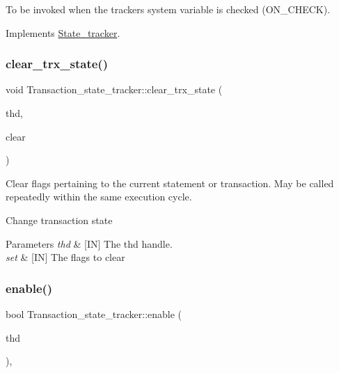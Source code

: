 To be invoked when the tracker\textquotesingle{}s system variable is checked (O\+N\+\_\+\+C\+H\+E\+CK). 

Implements \mbox{\hyperlink{classState__tracker_a50923266a6300e657b70dc4f0125782c}{State\+\_\+tracker}}.

\mbox{\label{classTransaction__state__tracker_aa8a01939d3da4f3e87e5b833f79b635f}} 
\subsubsection{\texorpdfstring{clear\+\_\+trx\+\_\+state()}{clear\_trx\_state()}}
{\footnotesize\ttfamily void Transaction\+\_\+state\+\_\+tracker\+::clear\+\_\+trx\+\_\+state (\begin{DoxyParamCaption}\item[{T\+HD $\ast$}]{thd,  }\item[{uint}]{clear }\end{DoxyParamCaption})}



Clear flags pertaining to the current statement or transaction. May be called repeatedly within the same execution cycle. 

Change transaction state


\begin{DoxyParams}{Parameters}
{\em thd} & \mbox{[}IN\mbox{]} The thd handle. \\
\hline
{\em set} & \mbox{[}IN\mbox{]} The flags to clear \\
\hline
\end{DoxyParams}
\mbox{\label{classTransaction__state__tracker_a1027295403af650734a45d8281cc5d1c}} 
\subsubsection{\texorpdfstring{enable()}{enable()}}
{\footnotesize\ttfamily bool Transaction\+\_\+state\+\_\+tracker\+::enable (\begin{DoxyParamCaption}\item[{T\+HD $\ast$}]{thd }\end{DoxyParamCaption})\hspace{0.3cm}{\ttfamily [inline]}, {\ttfamily [virtual]}}


